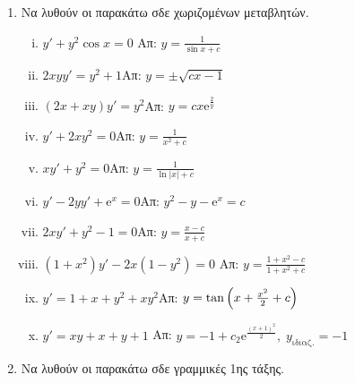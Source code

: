 

\pagestyle{askhseis}





\begin{center}
  \minibox{\large \bfseries \textcolor{Col1}{Συνήθεις Διαφορικές Εξισώσεις - 1ης τάξης}}
\end{center}

\vspace{\baselineskip}

\begin{enumerate}

  \item Να λυθούν οι παρακάτω σδε χωριζομένων μεταβλητών.

    \begin{enumerate}[i)]
      \item $ y'+y^{2} \cos{x} = 0 $ \hfill Απ: $ y = \frac{1}{\sin{x} + c} $  %
      \item $2xyy'=y^2+1$\hfill Απ: $y= \pm \sqrt{cx-1}$  %
      \item $(2x+xy)y'=y^2$\hfill Απ: $y=cx \mathrm{e}^{\frac{2}{y}}$
      \item $y'+2xy^2=0$\hfill Απ: $y=\frac{1}{x^2+c}$ %
      \item $xy'+y^2=0$\hfill Απ: $y=\frac{1}{\ln|x|+c}$ %
      \item $y'-2yy'+ \mathrm{e}^x=0$\hfill Απ: $y^2-y- \mathrm{e}^x=c$ %
      \item $2xy'+y^2-1=0$\hfill Απ: $y=\frac{x-c}{x+c}$ %
      \item $(1+x^2)y'-2x(1-y^2)=0$ %
        \hfill Απ: $y= \frac{1+x^{2}-c}{1+x^{2}+c}$
      \item $y'=1+x+y^2+xy^2$\hfill Απ: $y=\tan{\Bigl(x+\frac{x^2}{2}+c\Bigr)}$ %
      \item $y'=xy+x+y+1$
        \hfill Απ: $y=-1+c_2 \mathrm{e}^{\frac{(x+1)^2}{2}}, \; y_{\text{ιδιαζ.}}=-1$
    \end{enumerate}

  \item Να λυθούν οι παρακάτω σδε γραμμικές 1ης τάξης.


\end{enumerate}
